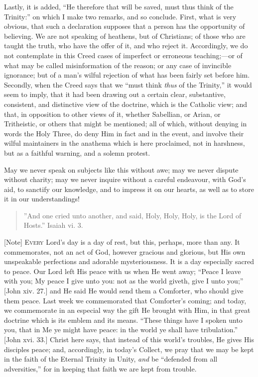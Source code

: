 Lastly, it is added, ``He therefore that will be saved, must
thus think of the Trinity:'' on which I make two remarks, and so
conclude. First, what is very obvious, that such a declaration
supposes that a person has the opportunity of believing. We are not
speaking of heathens, but of Christians; of those who are taught the
truth, who have the offer of it, and who reject it. Accordingly, we do
not contemplate in this Creed cases of imperfect or erroneous
teaching;—or of what may be called misinformation of the reason; or
any case of invincible ignorance; but of a man's wilful rejection of
what has been fairly set before him. Secondly, when the Creed says
that we ``must think \emph{thus} of the Trinity,'' it would
seem to imply, that it had been drawing out a certain clear,
substantive, consistent, and distinctive view of the doctrine, which
is the Catholic view; and that, in opposition to other views of it,
whether Sabellian, or Arian, or Tritheistic, or others that might be
mentioned; all of which, without denying in words the Holy Three, do
deny Him in fact and in the event, and involve their wilful
maintainers in the anathema which is here proclaimed, not in
harshness, but as a faithful warning, and a solemn protest.

May we never speak on subjects like this without awe; may we never
dispute without charity; may we never inquire without a careful
endeavour, with God's aid, to sanctify our knowledge, and to impress
it on our hearts, as well as to store it in our understandings!


\begin{quote}

''And one cried unto another, and said, Holy, Holy,
Holy, is the Lord of Hosts.'' Isaiah vi. 3.

\end{quote}

[Note] E\textsc{very} Lord's day is a day
of rest, but this, perhaps, more than any. It commemorates, not an act
of God, however gracious and glorious, but His own unspeakable
perfections and adorable mysteriousness. It is a day especially sacred
to peace. Our Lord left His peace with us when He went away;
``Peace I leave with you; My peace I give unto you: not as the
world giveth, give I unto you;'' [John xiv. 27.] and He said He
would send them a Comforter, who should give them peace. Last week we
commemorated that Comforter's coming; and today, we commemorate in an
especial way the gift He brought with Him, in that great doctrine
which is its emblem and its means. ``These things have I spoken
unto you, that in Me ye might have peace: in the world ye shall have
tribulation.'' [John xvi. 33.] Christ here says, that instead of
this world's troubles, He gives His disciples peace; and, accordingly,
in today's Collect, we pray that we may be kept in the faith of the
Eternal Trinity in Unity, \emph{and} be ``defended from all
adversities,'' for in keeping that faith we are kept from trouble.

